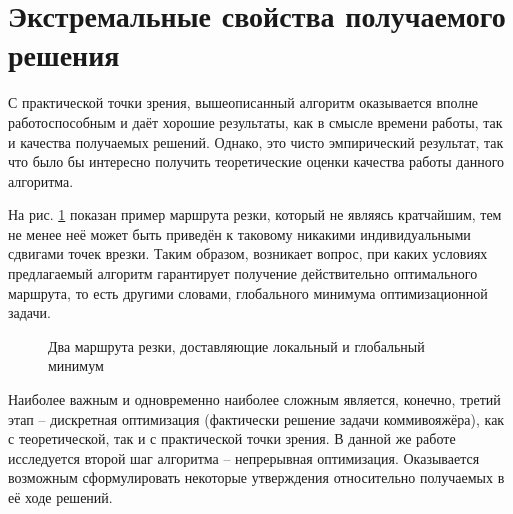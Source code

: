 
\section{Экстремальные свойства получаемого решения}
\label{sec:ccp.proof}

С практической точки зрения,
вышеописанный алгоритм оказывается
вполне работоспособным
и даёт хорошие результаты,
как в смысле времени работы,
так и качества получаемых решений.
Однако,
это чисто эмпирический результат,
так что было бы интересно получить
теоретические оценки качества работы
данного алгоритма.

На рис. \ref{fig:ccp-counter-example}
показан пример маршрута резки,
который не являясь кратчайшим,
тем не менее неё
может быть приведён к таковому
никакими индивидуальными сдвигами
точек врезки.
Таким образом, возникает вопрос,
при каких условиях предлагаемый алгоритм
гарантирует получение действительно
оптимального маршрута,
то есть другими словами,
глобального минимума оптимизационной задачи.

\begin{figure}[b]
  \begin{center}
  \end{center}
  \caption{Два маршрута резки, доставляющие локальный и глобальный минимум}
  \label{fig:ccp-counter-example}
\end{figure}

Наиболее важным и одновременно
наиболее сложным является,
конечно, третий этап --
дискретная оптимизация
(фактически решение задачи коммивояжёра),
как с теоретической,
так и с практической точки зрения.
В данной же работе исследуется
второй шаг алгоритма --
непрерывная оптимизация.
Оказывается возможным сформулировать
некоторые утверждения относительно
получаемых в её ходе решений.

